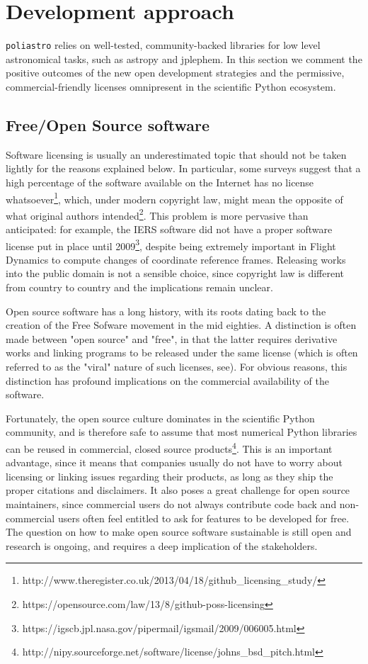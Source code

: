 \section{Development approach}
\label{sec:development}

\verb|poliastro| relies on well-tested, community-backed libraries for low level astronomical tasks, such as astropy\cite{Robitaille2013} and jplephem. In this section we comment the positive outcomes of the new open development strategies and the permissive, commercial-friendly licenses omnipresent in the scientific Python ecosystem.

\subsection{Free/Open Source software}

Software licensing is usually an underestimated topic that should not be taken lightly for the reasons explained below. In particular, some surveys suggest that a high percentage of the software available on the Internet has no license whatsoever\footnote{http://www.theregister.co.uk/2013/04/18/github\_licensing\_study/}, which, under modern copyright law, might mean the opposite of what original authors intended\footnote{https://opensource.com/law/13/8/github-poss-licensing}. This problem is more pervasive than anticipated: for example, the IERS software did not have a proper software license put in place until 2009\footnote{https://igscb.jpl.nasa.gov/pipermail/igsmail/2009/006005.html}, despite being extremely important in Flight Dynamics to compute changes of coordinate reference frames. Releasing works into the public domain is not a sensible choice, since copyright law is different from country to country and the implications remain unclear\cite{deazley2006rethinking}.

Open source software has a long history, with its roots dating back to the creation of the Free Sofware movement in the mid eighties\cite{Stallman:1985:GM}. A distinction is often made between "open source" and "free", in that the latter requires derivative works and linking programs to be released under the same license (which is often referred to as the "viral" nature of such licenses, see\cite{stallman2009viewpoint}). For obvious reasons, this distinction has profound implications on the commercial availability of the software.

Fortunately, the open source culture dominates in the scientific Python community, and is therefore safe to assume that most numerical Python libraries can be reused in commercial, closed source products\footnote{http://nipy.sourceforge.net/software/license/johns\_bsd\_pitch.html}. This is an important advantage, since it means that companies usually do not have to worry about licensing or linking issues regarding their products, as long as they ship the proper citations and disclaimers. It also poses a great challenge for open source maintainers, since commercial users do not always contribute code back and non-commercial users often feel entitled to ask for features to be developed for free. The question on how to make open source software sustainable is still open and research is ongoing, and requires a deep implication of the stakeholders.

